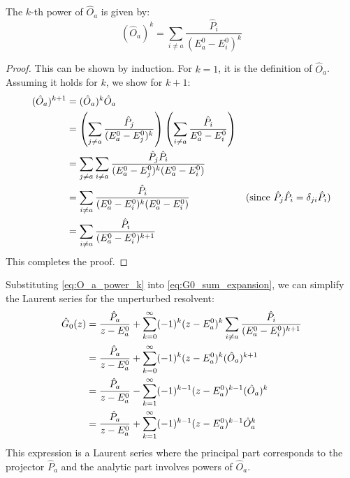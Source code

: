 \begin{lemma}
    The $k$-th power of $\hat O_a$ is given by:
    \begin{equation} \label{eq:O_a_power_k}
        (\hat O_a)^k = \sum_{i \ne a} \frac{\hat P_i}{(E_a^0 - E_i^0)^k}
    \end{equation}
\end{lemma}
\begin{proof}
    This can be shown by induction. For $k=1$, it is the definition
    of $\hat O_a$. Assuming it holds for $k$, we show for $k+1$:
    \begin{align} \label{eq:O_a_power_k_proof}
        (\hat O_a)^{k+1} &= (\hat O_a)^k \hat O_a \\
        &= \left( \sum_{j \ne a} \frac{\hat P_j}{(E_a^0 - E_j^0)^k}
        \right) \left( \sum_{i \ne a} \frac{\hat P_i}{E_a^0 - E_i^0}
        \right) \notag \\
        &= \sum_{j \ne a} \sum_{i \ne a} \frac{\hat P_j \hat
        P_i}{(E_a^0 - E_j^0)^k (E_a^0 - E_i^0)} \notag \\
        &= \sum_{i \ne a} \frac{\hat P_i}{(E_a^0 - E_i^0)^k (E_a^0 -
        E_i^0)} \quad &\text{(since } \hat P_j \hat P_i =
        \delta_{ji} \hat P_i \text{)} \notag \\
        &= \sum_{i \ne a} \frac{\hat P_i}{(E_a^0 - E_i^0)^{k+1}} \notag
    \end{align}
    This completes the proof.
\end{proof}

Substituting \eqref{eq:O_a_power_k} into \eqref{eq:G0_sum_expansion},
we can simplify the Laurent series for the unperturbed resolvent:
\begin{align} \label{eq:G0_laurent_simplified}
    \hat G_0(z) &= \frac{\hat P_a}{z - E_a^0} + \sum_{k=0}^\infty
    (-1)^k (z-E_a^0)^k \sum_{i\neq a}\frac{\hat P_i}{(E_a^0-E_i^0)^{k+1}} \\
    &= \frac{\hat P_a}{z-E_a^0} + \sum_{k=0}^\infty (-1)^k
    (z-E_a^0)^k (\hat O_a)^{k+1} \notag \\
    &= \frac{\hat P_a}{z-E_a^0} - \sum_{k=1}^\infty (-1)^{k-1}
    (z-E_a^0)^{k-1} (\hat O_a)^{k} \notag \\
    &= \frac{\hat P_a}{z-E_a^0} + \sum_{k=1}^\infty (-1)^{k-1}
    (z-E_a^0)^{k-1} \hat O_a^k \notag
\end{align}
This expression is a Laurent series where the principal part
corresponds to the projector $\hat P_a$ and the analytic part
involves powers of $\hat O_a$.

